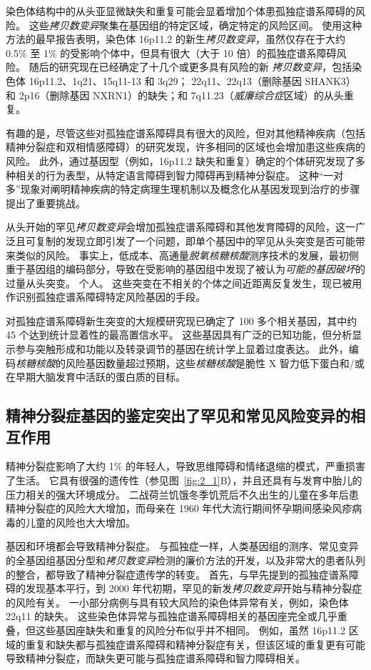 染色体结构中的从头亚显微缺失和重复可能会显着增加个体患孤独症谱系障碍的风险。
这些\textit{拷贝数变异}聚集在基因组的特定区域，确定特定的风险区间。 使用这种方法的最早报告表明，染色体 16p11.2 的新生\textit{拷贝数变异}，虽然仅存在于大约 0.5\% 至 1\% 的受影响个体中，但具有很大（大于 10 倍）的孤独症谱系障碍风险。
随后的研究现在已经确定了十几个或更多具有风险的新 \textit{拷贝数变异}，包括染色体 16p11.2、1q21、15q11-13 和 3q29； 22q11、22q13（删除基因 SHANK3）和 2p16（删除基因 NXRN1）的缺失；和 7q11.23（\textit{威廉综合症}区域）的从头重复。


有趣的是，尽管这些对孤独症谱系障碍具有很大的风险，但对其他精神疾病（包括精神分裂症和双相情感障碍）的研究发现，许多相同的区域也会增加患这些疾病的风险。
此外，通过基因型（例如，16p11.2 缺失和重复）确定的个体研究发现了多种相关的行为表型，从特定语言障碍到智力障碍再到精神分裂症。
这种“一对多”现象对阐明精神疾病的特定病理生理机制以及概念化从基因发现到治疗的步骤提出了重要挑战。


从头开始的罕见\textit{拷贝数变异}会增加孤独症谱系障碍和其他发育障碍的风险，这一广泛且可复制的发现立即引发了一个问题，即单个基因中的罕见从头突变是否可能带来类似的风险。
事实上，低成本、高通量\textit{脱氧核糖核酸}测序技术的发展，最初侧重于基因组的编码部分，导致在受影响的基因组中发现了被认为\textit{可能的基因破坏}的过量从头突变。
个人。
这些突变在不相关的个体之间近距离反复发生，现已被用作识别孤独症谱系障碍特定风险基因的手段。


对孤独症谱系障碍新生突变的大规模研究现已确定了 100 多个相关基因，其中约 45 个达到统计显着性的最高置信水平。
这些基因具有广泛的已知功能，但分析显示参与突触形成和功能以及转录调节的基因在统计学上显着过度表达。
此外，编码\textit{核糖核酸}的风险基因数量超过预期，这些\textit{核糖核酸}是脆性 X 智力低下蛋白和/或在早期大脑发育中活跃的蛋白质的目标。



\subsection{精神分裂症基因的鉴定突出了罕见和常见风险变异的相互作用}

精神分裂症影响了大约 1\% 的年轻人，导致思维障碍和情绪退缩的模式，严重损害了生活。
它具有很强的遗传性（参见图~\ref{fig:2_1}B），并且还具有与发育中胎儿的压力相关的强大环境成分。
二战荷兰饥饿冬季饥荒后不久出生的儿童在多年后患精神分裂症的风险大大增加，而母亲在 1960 年代大流行期间怀孕期间感染风疹病毒的儿童的风险也大大增加。


基因和环境都会导致精神分裂症。
与孤独症一样，人类基因组的测序、常见变异的全基因组基因分型和\textit{拷贝数变异}检测的廉价方法的开发，以及非常大的患者队列的整合，都导致了精神分裂症遗传学的转变。
首先，与早先提到的孤独症谱系障碍的发现基本平行，到 2000 年代初期，罕见的新发\textit{拷贝数变异}开始与精神分裂症的风险有关。
一小部分病例与具有较大风险的染色体异常有关，例如，染色体 22q11 的缺失。
这些染色体异常与孤独症谱系障碍相关的基因座完全或几乎重叠，但这些基因座缺失和重复的风险分布似乎并不相同。
例如，虽然 16p11.2 区域的重复和缺失都与孤独症谱系障碍和精神分裂症有关，但该区域的重复更有可能导致精神分裂症，而缺失更可能与孤独症谱系障碍和智力障碍相关。


